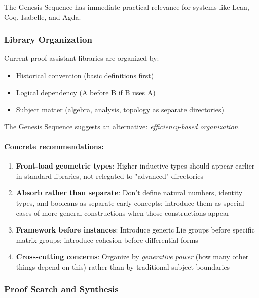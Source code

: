 \documentclass[11pt]{article}
\theoremstyle{definition}
\begin{document}
The Genesis Sequence has immediate practical relevance for systems like Lean, Coq, Isabelle, and Agda.

\subsubsection{Library Organization}

Current proof assistant libraries are organized by:
\begin{itemize}
\item Historical convention (basic definitions first)
\item Logical dependency (A before B if B uses A)
\item Subject matter (algebra, analysis, topology as separate directories)
\end{itemize}

The Genesis Sequence suggests an alternative: \emph{efficiency-based organization}.

\paragraph{Concrete recommendations:}

\begin{enumerate}
\item \textbf{Front-load geometric types}: Higher inductive types should appear earlier in standard libraries, not relegated to "advanced" directories

\item \textbf{Absorb rather than separate}: Don't define natural numbers, identity types, and booleans as separate early concepts; introduce them as special cases of more general constructions when those constructions appear

\item \textbf{Framework before instances}: Introduce generic Lie groups before specific matrix groups; introduce cohesion before differential forms

\item \textbf{Cross-cutting concerns}: Organize by \emph{generative power} (how many other things depend on this) rather than by traditional subject boundaries
\end{enumerate}

\subsubsection{Proof Search and Synthesis}
\end{document}

